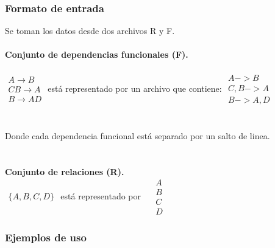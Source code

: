 \documentclass{article}
\begin{document}
\subsubsection{Formato de entrada}
\noindent
Se toman los datos desde dos archivos R y F. \\ \\
\noindent
\textbf{\small{Conjunto de dependencias funcionales (F).}} \\ \\
$\begin{array}{lcr}
    A \rightarrow B \\
    CB \rightarrow A \\ 
    B \rightarrow AD  
\end{array}$ está representado por un archivo que contiene:
$ 
\begin{array}{lcr}
    A -> B \\
    C,B -> A \\ 
    B -> A,D 
\end{array} $ \\ \\ \\
Donde cada dependencia funcional está separado por un salto de linea. \\ \\ \\
\noindent
\textbf{\small{Conjunto de relaciones (R).}} \\ 
$
\begin{array}{lcr}
    \{ A,B,C,D \}
\end{array}$ \quad está representado por
$ \quad
\begin{array}{lcr}
    A\\
    B\\ 
    C\\
    D 
\end{array} $ 
\subsubsection{Ejemplos de uso}
\noindent
{} \\ \\
{} \\ \\
{} \\ \\
{} \\ \\
\newpage
\end{document}
